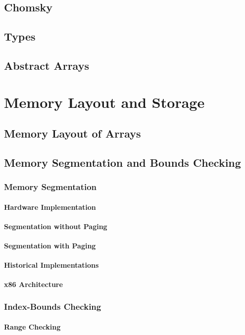\documentclass[12pt, oneside]{book}
\begin{document}
	\section{Chomsky}
	\section{Types}
	\section{Abstract Arrays}
	\chapter{Memory Layout and Storage}
	\section{Memory Layout of Arrays}
	\section{Memory Segmentation and Bounds Checking}
	\subsection{Memory Segmentation}
	\subsubsection{Hardware Implementation}
	\subsubsection{Segmentation without Paging}
	\subsubsection{Segmentation with Paging}
	\subsubsection{Historical Implementations}
	\subsubsection{x86 Architecture}
	\subsection{Index-Bounds Checking}
	\subsubsection{Range Checking}
\end{document}
